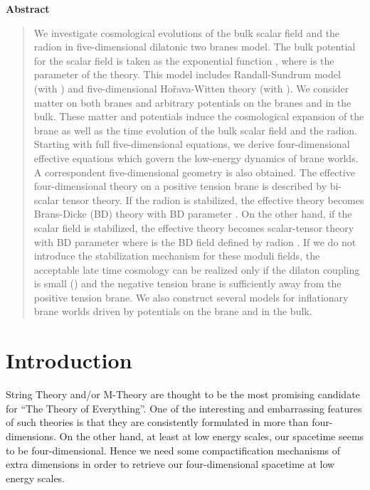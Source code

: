 \documentclass[a4paper,11pt]{article}
\begin{document}
\vskip 1cm
{\centerline{\large\bf Abstract}}
\begin{quotation}
\vskip -0.4cm
%
We investigate cosmological evolutions of the 
bulk scalar field \coordHE{} and the radion \coordHE{} in five-dimensional 
dilatonic two branes model. The bulk potential for the scalar field is 
taken as the exponential function \coordHE{},
where \coordHE{} is the parameter of the theory. 
This model includes Randall-Sundrum model (with \coordHE{}) and five-dimensional 
Ho\v{r}ava-Witten theory (with \coordHE{}). We consider matter on both 
branes and arbitrary potentials on the branes and in the bulk. These matter and 
potentials induce the cosmological expansion of the brane as well as the 
time evolution of the bulk scalar field and the radion. Starting with full 
five-dimensional equations, we derive four-dimensional 
effective equations which govern the low-energy dynamics of brane worlds. 
A correspondent five-dimensional geometry is also obtained. The effective 
four-dimensional theory on a positive tension brane is described by bi-scalar 
tensor theory.  If the radion is stabilized, the effective theory becomes 
Brans-Dicke (BD) theory with BD parameter \coordHE{}. On the other hand, 
if the scalar field is stabilized, the effective theory becomes scalar-tensor theory 
with BD parameter \coordHE{} where \myHighlight{$\varphi$}\coordHE{} is 
the BD field defined by radion \coordHE{}. If we do not introduce the stabilization
mechanism for these moduli fields, the acceptable late
time cosmology can be realized only if the dilaton coupling \coordHE{} is small
(\coordHE{}) and the negative tension brane is sufficiently
away from the positive tension brane. We also construct several models for
inflationary brane worlds driven by potentials on the brane and in the bulk. 

\end{quotation}

\newpage

\section{Introduction}

String Theory and/or M-Theory are thought to be the most promising 
candidate for ``The Theory of Everything''. One of the interesting 
and embarrassing features of such theories is that they are consistently 
formulated in more than four-dimensions. On the other hand, at least 
at low energy scales, our spacetime seems to be four-dimensional. 
Hence we need some compactification mechanisms of extra dimensions 
in order to retrieve our four-dimensional spacetime at low energy
scales. 
 
\end{document}
